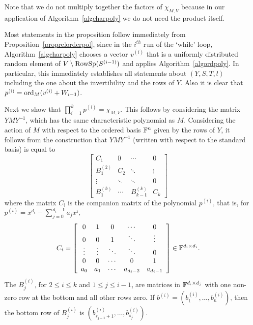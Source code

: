 \begin{Rem}
Note that we do not multiply together the factors of 
$\chi_{M,V}$ because in our application of Algorithm~\ref{algcharpoly} 
we do not need the product itself.
\end{Rem}

Most statements in the proposition follow immediately from 
Proposition~\ref{proprelorderpol}, since in the $i^{th}$ run of the 
`while' loop, Algorithm~\ref{algcharpoly}
chooses a  vector $v^{(i)}$ that is a uniformly distributed random element 
of $V\setminus \mathrm{RowSp}(S^{(i-1)})$
and applies Algorithm~\ref{algordpoly}.
In particular, this immediately establishes all statements about
$(Y,S,T,l)$ including the one about the invertibility and the
rows of $Y$. Also it is clear that $p^{(i)} = \mathrm{ord}_M(v^{(i)} + W_{i-1})$.

Next we show that $\prod_{i=1}^k p^{(i)} = \chi_{M,V}$. 
This follows by considering
the matrix $YMY^{-1}$, which has the same characteristic polynomial
as $M$. Considering the action of $M$ with respect to the 
ordered basis $\mathbb{F}^n$ given by the rows of $Y$, it follows from
the construction that $YMY^{-1}$ 
(written with respect to the standard basis) is equal to
\[ \left[\begin{array}{cccc}
 C_1       &   0  & \cdots & 0 \\
 B^{(2)}_1 &  C_2 & \ddots & \vdots \\
 \vdots    &\ddots& \ddots & 0 \\
 B^{(k)}_1 &\cdots& B^{(k)}_{k-1} & C_k
\end{array} \right] \]
where the matrix $C_i$ is the companion matrix of the polynomial $p^{(i)}$,
that is, for $p^{(i)} = x^{d_i} - \sum_{j=0}^{d_i-1} a_j x^j$,
\[ C_i = \left[ \begin{array}{ccccc}
  0      & 1      & 0      & \cdots    & 0 \\
  0      & 0      & 1      & \ddots    & \vdots \\
  \vdots & \vdots & \ddots & \ddots    & 0 \\
  0      & 0      & \cdots & 0         & 1 \\
  a_0    & a_1    & \cdots & a_{d_i-2} & a_{d_i-1}
    \end{array} \right] \in \mathbb{F}^{d_i \times d_i}. \]
The $B^{(i)}_j$, for $2 \le i \le k$ and $1 \le j \le i-1$, are matrices
in $\mathbb{F}^{d_i \times d_j}$
with one non-zero row at the bottom and all other rows zero.
If $b^{(i)} = (b^{(i)}_1,\dots,b^{(i)}_n)$, then the bottom row of 
$B^{(i)}_j$ is $(b^{(i)}_{s_{j-1}+1},\dots,b^{(i)}_{s_j})$.

